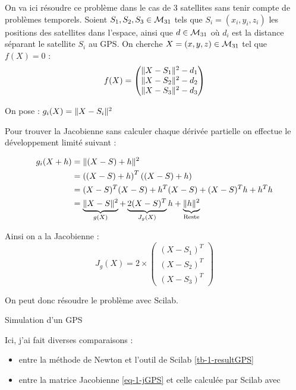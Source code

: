 		On va ici résoudre ce problème dans le cas de 3 satellites sans tenir compte de problèmes temporels.
		Soient $S_1, S_2, S_3\in\mathcal{M}_{31}$ tels que $S_i=(x_i,y_i,z_i)$ les positions des satellites dans l'espace, ainsi que $d\in\mathcal{M}_{31}$ où $d_i$ est la distance séparant le satellite $S_i$ au GPS.
		On cherche $X = (x,y,z) \in\mathcal{M}_{31}$ tel que $f(X) = 0$ :
		\begin{equation}
			\label{eq-1-fGPS}
			f(X) = \begin{pmatrix}
				\lVert X - S_1 \rVert^2 - d_1	\\
				\lVert X - S_2 \rVert^2 - d_2	\\
				\lVert X - S_3 \rVert^2 - d_3
			\end{pmatrix}
		\end{equation}

		On pose : $g_i(X) = \lVert X - S_i \rVert^2$

		Pour trouver la Jacobienne sans calculer chaque dérivée partielle on effectue le développement limité suivant :

		\begin{align*}
			g_i(X+h) 	&= \lVert (X-S) +h \rVert^2								\\
						&= \left((X-S)+h\right)^T\left((X-S)+h\right)		\\
						&= (X-S)^T(X-S) + h^T(X-S) + (X-S)^T h + h^Th		\\
						&= \underbrace{\lVert X-S \rVert^2}_{g(X)} + \underbrace{2(X-S)^T}_{J_g(X)}h + \underbrace{\lVert h \rVert^2}_{\text{Reste}}
		\end{align*}

		Ainsi on a la Jacobienne :
		\begin{equation}
			\label{eq-1-jGPS}
			J_g(X) = 2\times\begin{pmatrix}
								(X-S_1)^T \\
								(X-S_2)^T \\
								(X-S_3)^T
							\end{pmatrix}
		\end{equation}

		On peut donc résoudre le problème avec Scilab.
		\begin{listing}[H]
			\caption{Simulation d'un GPS}
			\label{code-1-GPS}
		\end{listing}

		Ici, j'ai fait diverses comparaisons :
		\begin{itemize}
			\item entre la méthode de Newton et l'outil  de Scilab \ref{tb-1-resultGPS}
			\item entre la matrice Jacobienne \eqref{eq-1-jGPS} et celle calculée par Scilab avec 
		\end{itemize}

